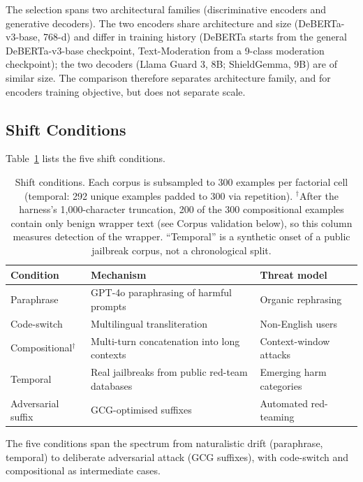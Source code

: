\documentclass{article}
\begin{document}
The selection spans two architectural families (discriminative encoders and generative decoders). The two encoders share architecture and size (DeBERTa-v3-base, 768-d) and differ in training history (DeBERTa starts from the general DeBERTa-v3-base checkpoint, Text-Moderation from a 9-class moderation checkpoint); the two decoders (Llama Guard 3, 8B; ShieldGemma, 9B) are of similar size. The comparison therefore separates architecture family, and for encoders training objective, but does not separate scale.

\subsection{Shift Conditions}
\label{sec:shifts}

Table~\ref{tab:shifts} lists the five shift conditions.

\begin{table}[t]
\caption{Shift conditions. Each corpus is subsampled to 300 examples per factorial cell (temporal: 292 unique examples padded to 300 via repetition). $^\dagger$After the harness's 1{,}000-character truncation, 200 of the 300 compositional examples contain only benign wrapper text (see Corpus validation below), so this column measures detection of the wrapper. ``Temporal'' is a synthetic onset of a public jailbreak corpus, not a chronological split.}
\label{tab:shifts}
\centering
\small
\begin{tabular}{lll}
\toprule
\textbf{Condition} & \textbf{Mechanism} & \textbf{Threat model} \\
\midrule
Paraphrase & GPT-4o paraphrasing of harmful prompts & Organic rephrasing \\
Code-switch & Multilingual transliteration & Non-English users \\
Compositional$^\dagger$ & Multi-turn concatenation into long contexts & Context-window attacks \\
Temporal & Real jailbreaks from public red-team databases & Emerging harm categories \\
Adversarial suffix & GCG-optimised suffixes~\citep{zou2023universal} & Automated red-teaming \\
\bottomrule
\end{tabular}
\end{table}

The five conditions span the spectrum from naturalistic drift (paraphrase, temporal) to deliberate adversarial attack (GCG suffixes), with code-switch and compositional as intermediate cases.
\end{document}

